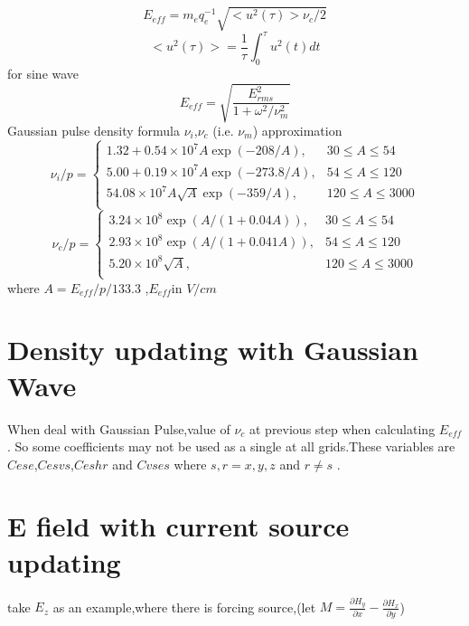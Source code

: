 \documentclass[a4paper,10pt]{article}
\begin{document}
\begin{equation}\label{EeffNorm}
E_{eff} = m_{e} q_{e}^{-1} \sqrt{ < u^{2}(\tau) > \nu_{c} /2 }
\end{equation}
\begin{equation}
<u^{2}(\tau)>=\frac{1}{\tau}\int^{\tau}_{0}u^{2}(t)d t
\end{equation}
for sine wave
\begin{equation}
E_{eff}=\sqrt{\frac{E_{rms}^{2}}{1+\omega^{2}/\nu^{2}_{m}}}
\end{equation}
Gaussian pulse density formula
$\nu_{i}$,$\nu_{c}$ (i.e. $\nu_{m}$) approximation
\begin{equation}\label{nu_i_1}
\nu_{i}/p=\left\lbrace\begin{array}{ll}
1.32+0.54\times 10^7A \exp \left(-208/A\right),&30\leqslant A\leqslant 54\\
5.00+0.19\times 10^7A \exp \left(-273.8/A\right),&54\leqslant A\leqslant 120\\
54.08\times 10^7A \sqrt{A} \exp \left(-359/A\right),&120\leqslant A\leqslant 3000\\
\end{array}\right.
\end{equation}
\begin{equation}\label{nu_c_1}
\nu_{c}/p=\left\lbrace\begin{array}{ll}
3.24\times 10^8 \exp\left( A/(1+0.04A)\right),&30\leqslant A\leqslant 54\\
2.93\times 10^8 \exp\left( A/(1+0.041A)\right),&54\leqslant A\leqslant 120\\
5.20\times 10^8 \sqrt{A},&120\leqslant A\leqslant 3000\\
\end{array}\right.
\end{equation}
where $A=E_{eff}/p/133.3$ ,$E_{eff}$in $V/cm$
\section{Density updating with Gaussian Wave}
When deal with Gaussian Pulse,value of  $\nu_{c}$ at  previous step when calculating $E_{eff}$.
So some coefficients may not be used as a single at all grids.These variables are $Cese$,$Cesvs$,$Ceshr$ and $Cvses$ 
where \newline $ s,r=x,y,z $ and $ r \neq s $ .


\section{E field with current source updating}
take $E_{z}$ as an example,where there is forcing source,(let $M=\frac{\partial H_{y}}{\partial x}-\frac{\partial H_{x}}{\partial y}$)
\end{document}
